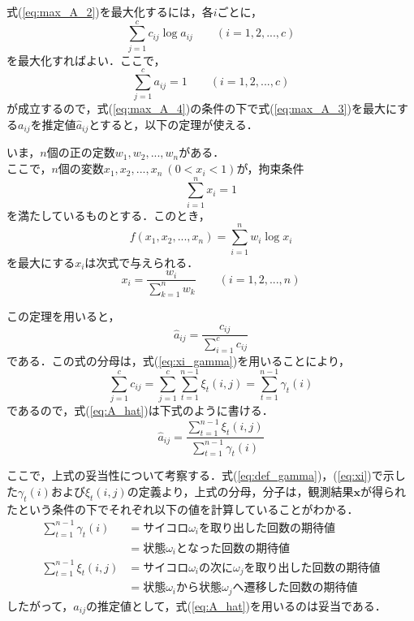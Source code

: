 \documentclass[a4j]{jarticle}
\begin{document}
式(\ref{eq:max_A_2})を最大化するには，各$i$ごとに，
\begin{equation}
\sum_{j=1}^{c} c_{ij} \log a_{ij} \qquad (i = 1, 2, ..., c) \label{eq:max_A_3}
\end{equation}
を最大化すればよい．ここで，
\begin{equation}
\sum_{j=1}^{c} a_{ij} = 1 \qquad (i = 1, 2, ..., c) \label{eq:max_A_4}
\end{equation}
が成立するので，式(\ref{eq:max_A_4})の条件の下で式(\ref{eq:max_A_3})を最大にする$a_{ij}$を推定値$\hat{a}_{ij}$とすると，以下の定理が使える．

\begin{mdframed}[topline = false, bottomline = false, rightline = false, innerlinewidth = 2pt, frametitle = 定理1]
	いま，$n$個の正の定数$w_{1},w_{2},...,w_{n}$がある．\\
	ここで，$n$個の変数$x_{1}, x_{2}, ..., x_{n} \ (0 < x_{i} < 1)$が，拘束条件
	\begin{equation}
	\sum_{i = 1}^{n} x_{i} = 1
	\end{equation}
	を満たしているものとする．このとき，
	\begin{equation}
	f(x_{1}, x_{2}, ..., x_{n}) = \sum_{i = 1}^{n} w_{i} \log x_{i}
	\end{equation}
	を最大にする$x_{i}$は次式で与えられる．
	\begin{equation}
	x_{i} = \frac{w_{i}}{ \displaystyle \sum_{k=1}^{n} w_{k}} \qquad (i = 1, 2, ..., n)
	\end{equation}
\end{mdframed}

この定理を用いると，
\begin{equation}
\hat{a}_{ij} = \frac{c_{ij}}{\displaystyle \sum_{i=1}^{c} c_{ij}} \label{eq:A_hat}
\end{equation}
である．この式の分母は，式(\ref{eq:xi_gamma})を用いることにより，
\begin{equation}
\sum_{j=1}^{c} c_{ij} = \sum_{j=1}^{c} \sum_{t=1}^{n-1} \xi_{t} (i, j) = \sum_{t=1}^{n-1} \gamma_{t}(i)
\end{equation}
であるので，式(\ref{eq:A_hat})は下式のように書ける．
\begin{equation}
\hat{a}_{ij} = \frac{\displaystyle \sum_{t=1}^{n-1} \xi_{t} (i, j)}{\displaystyle \sum_{t=1}^{n-1} \gamma_{t} (i)}
\end{equation}

ここで，上式の妥当性について考察する．式(\ref{eq:def_gamma})，(\ref{eq:xi})で示した$\gamma_{t}(i)$および$\xi_{t}(i, j)$の定義より，上式の分母，分子は，観測結果$\mathbf{x}$が得られたという条件の下でそれぞれ以下の値を計算していることがわかる．
\begin{align*}
\sum_{t=1}^{n-1} \gamma_{t} (i) & = サイコロ\omega_{i}を取り出した回数の期待値 \\
& = 状態\omega_{i}となった回数の期待値 \\
\sum_{t=1}^{n-1} \xi_{t} (i, j) & = サイコロ\omega_{i}の次に\omega_{j}を取り出した回数の期待値 \\
& = 状態\omega_{i}から状態\omega_{j}へ遷移した回数の期待値
\end{align*}
したがって，$a_{ij}$の推定値として，式(\ref{eq:A_hat})を用いるのは妥当である．
\end{document}
